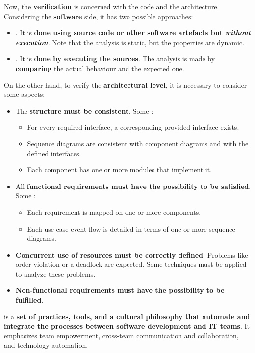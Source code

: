 \highspace
Now, the \textbf{verification} is concerned with the code and the architecture. Considering the \textbf{software} side, it has two possible approaches:
\begin{itemize}
    \item {}. It is \textbf{done using source code or other software artefacts but \emph{without execution}}. Note that the analysis is static, but the properties are dynamic.

    \item {}. It is \textbf{done by executing the sources}. The analysis is made by \textbf{comparing} the actual behaviour and the expected one.
\end{itemize}
On the other hand, to verify the \textbf{architectural level}, it is necessary to consider some aspects:
\begin{itemize}
    \item The \textbf{structure must be consistent}. Some :
    \begin{itemize}
        \item For every required interface, a corresponding provided interface exists.
        
        \item Sequence diagrams are consistent with component diagrams and with the defined interfaces.
        
        \item Each component has one or more modules that implement it.
    \end{itemize}

    \item All \textbf{functional requirements must have the possibility to be satisfied}. Some :
    \begin{itemize}
        \item Each requirement is mapped on one or more components.
        
        \item Each use case event flow is detailed in terms of one or more sequence diagrams.
    \end{itemize}

    \item \textbf{Concurrent use of resources must be correctly defined}. Problems like order violation or a deadlock are expected. Some techniques must be applied to analyze these problems. 
    
    \item \textbf{Non-functional requirements must have the possibility to be fulfilled}.
\end{itemize}

\highspace
\begin{definitionbox}
     is a \textbf{set of practices, tools, and a cultural philosophy that automate and integrate the processes between software development and IT teams}. It emphasizes team empowerment, cross-team communication and collaboration, and technology automation.
\end{definitionbox}